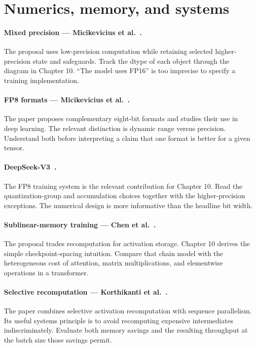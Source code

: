\section{Numerics, memory, and systems}
\paragraph{Mixed precision --- Micikevicius et al.~\cite{mixed}.}
The proposal uses low-precision computation while retaining selected higher-precision state and safeguards. Track the dtype of each object through the diagram in Chapter 10. ``The model uses FP16'' is too imprecise to specify a training implementation.

\paragraph{FP8 formats --- Micikevicius et al.~\cite{fp8}.}
The paper proposes complementary eight-bit formats and studies their use in deep learning. The relevant distinction is dynamic range versus precision. Understand both before interpreting a claim that one format is better for a given tensor.

\paragraph{DeepSeek-V3~\cite{deepseekv3}.}
The FP8 training system is the relevant contribution for Chapter 10. Read the quantization-group and accumulation choices together with the higher-precision exceptions. The numerical design is more informative than the headline bit width.

\paragraph{Sublinear-memory training --- Chen et al.~\cite{checkpoint}.}
The proposal trades recomputation for activation storage. Chapter 10 derives the simple checkpoint-spacing intuition. Compare that chain model with the heterogeneous cost of attention, matrix multiplications, and elementwise operations in a transformer.

\paragraph{Selective recomputation --- Korthikanti et al.~\cite{selective}.}
The paper combines selective activation recomputation with sequence parallelism. Its useful systems principle is to avoid recomputing expensive intermediates indiscriminately. Evaluate both memory savings and the resulting throughput at the batch size those savings permit.

